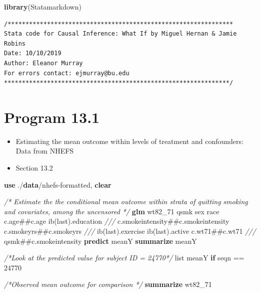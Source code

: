 \documentclass[
  10pt,
]{book}
\newenvironment{Shaded}{\begin{snugshade}}{\end{snugshade}}
\newcommand{\CommentTok}[1]{\textcolor[rgb]{0.56,0.35,0.01}{\textit{#1}}}
\newcommand{\FunctionTok}[1]{\textcolor[rgb]{0.00,0.00,0.00}{#1}}
\newcommand{\KeywordTok}[1]{\textcolor[rgb]{0.13,0.29,0.53}{\textbf{#1}}}
\newcommand{\NormalTok}[1]{#1}
\newcommand{\OtherTok}[1]{\textcolor[rgb]{0.56,0.35,0.01}{#1}}
\providecommand{\tightlist}{%
  \setlength{\itemsep}{0pt}\setlength{\parskip}{0pt}}
\begin{document}
\begin{Shaded}
\begin{Highlighting}[]
\KeywordTok{library}\NormalTok{(Statamarkdown)}
\end{Highlighting}
\end{Shaded}

\begin{verbatim}
/***************************************************************
Stata code for Causal Inference: What If by Miguel Hernan & Jamie Robins
Date: 10/10/2019
Author: Eleanor Murray 
For errors contact: ejmurray@bu.edu
***************************************************************/
\end{verbatim}

\hypertarget{program-13.1}{%
\section{Program 13.1}\label{program-13.1}}

\begin{itemize}
\tightlist
\item
  Estimating the mean outcome within levels of treatment and confounders: Data from NHEFS
\item
  Section 13.2
\end{itemize}

\begin{Shaded}
\begin{Highlighting}[]
\KeywordTok{use}\NormalTok{ ./}\KeywordTok{data}\NormalTok{/nhefs-formatted, }\KeywordTok{clear}

\CommentTok{/* Estimate the the conditional mean outcome within strata of quitting }
\CommentTok{smoking and covariates, among the uncensored */}
\KeywordTok{glm}\NormalTok{ wt82_71 qsmk sex race c.age##c.age ib(}\FunctionTok{last}\NormalTok{).education }\CommentTok{///}
\NormalTok{  c.smokeintensity##c.smokeintensity c.smokeyrs##c.smokeyrs }\CommentTok{///}
\NormalTok{  ib(}\FunctionTok{last}\NormalTok{).exercise ib(}\FunctionTok{last}\NormalTok{).active c.wt71##c.wt71 }\CommentTok{///}
\NormalTok{  qsmk##c.smokeintensity}
\KeywordTok{predict}\NormalTok{ meanY}
\KeywordTok{summarize}\NormalTok{ meanY}

\CommentTok{/*Look at the predicted value for subject ID = 24770*/}
\OtherTok{list}\NormalTok{ meanY }\KeywordTok{if}\NormalTok{ seqn == 24770}

\CommentTok{/*Observed mean outcome for comparison */}
\KeywordTok{summarize}\NormalTok{ wt82_71}
\end{Highlighting}
\end{Shaded}
\end{document}
